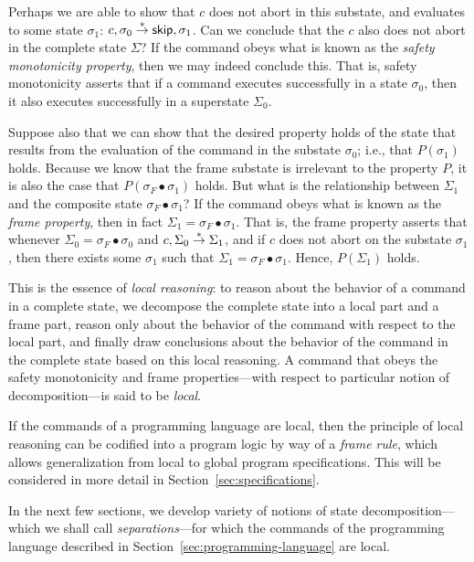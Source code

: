 \documentclass[11pt]{report}
\begin{document}
Perhaps we are able to show that $c$ does not abort in this substate, and evaluates to some state $\sigma_1$: $c,\sigma_0 \stackrel{\ast}{\rightarrow} \operatorname{\mathsf{skip}},\sigma_1$. Can we conclude that the $c$ also does not abort in the complete state $\Sigma$? If the command obeys what is known as the \emph{safety monotonicity property}, then we may indeed conclude this. That is, safety monotonicity asserts that if a command executes successfully in a state $\sigma_0$, then it also executes successfully in a superstate $\Sigma_0$.  

Suppose also that we can show that the desired property holds of the state that results from the evaluation of the command in the substate $\sigma_0$; i.e., that $P(\sigma_1)$ holds. Because we know that the frame substate is irrelevant to the property $P$, it is also the case that $P(\sigma_F \bullet \sigma_1)$ holds. But what is the relationship between $\Sigma_1$ and the composite state $\sigma_F \bullet \sigma_1$? If the command obeys what is known as the \emph{frame property}, then in fact $\Sigma_1 = \sigma_F \bullet \sigma_1$. That is, the frame property asserts that whenever $\Sigma_0 = \sigma_F \bullet \sigma_0$ and $c,\Sigma_0 \stackrel{\ast}{\rightarrow} \Sigma_1$, and if $c$ does not abort on the substate $\sigma_1$, then there exists some $\sigma_1$ such that $\Sigma_1 = \sigma_F \bullet \sigma_1$. Hence, $P(\Sigma_1)$ holds. 

This is the essence of \emph{local reasoning}: to reason about the behavior of a command in a complete state, we decompose the complete state into a local part and a frame part, reason only about the behavior of the command with respect to the local part, and finally draw conclusions about the behavior of the command in the complete state based on this local reasoning. A command that obeys the safety monotonicity and frame properties---with respect to particular notion of decomposition---is said to be \emph{local}.

If the commands of a programming language are local, then the principle of local reasoning can be codified into a program logic by way of a \emph{frame rule}, which allows generalization from local to global program specifications. This will be considered in more detail in Section~\ref{sec:specifications}. 

In the next few sections, we develop variety of notions of state decomposition---which we shall call \emph{separations}---for which the commands of the programming language described in Section~\ref{sec:programming-language} are local. 
\end{document}
